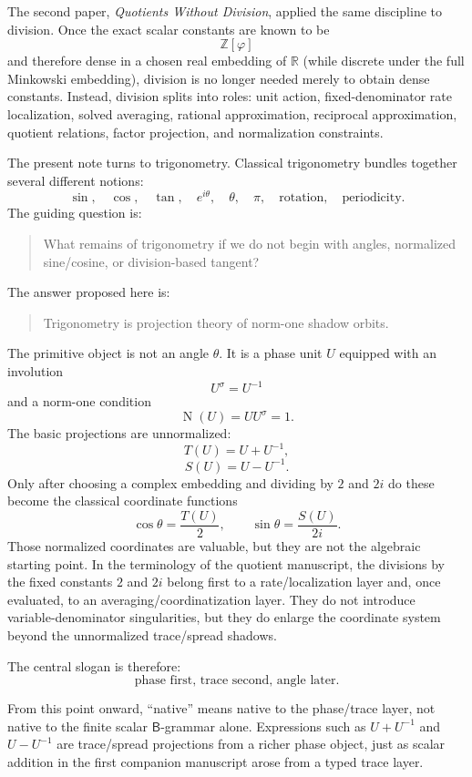\documentclass[11pt]{article}
\newcommand{\B}{\mathsf{B}}
\newcommand{\Nm}{\operatorname{N}}
\newcommand{\ph}{\varphi}
\newcommand{\sig}{\sigma}
\newcommand{\Z}{\mathbb{Z}}
\newcommand{\R}{\mathbb{R}}
\begin{document}
The second paper, \emph{Quotients Without Division}, applied the same discipline to division.  Once the exact scalar constants are known to be
\[
    \Z[\ph]
\]
and therefore dense in a chosen real embedding of $\R$ (while discrete under the full Minkowski embedding), division is no longer needed merely to obtain dense constants.  Instead, division splits into roles: unit action, fixed-denominator rate localization, solved averaging, rational approximation, reciprocal approximation, quotient relations, factor projection, and normalization constraints.

The present note turns to trigonometry.  Classical trigonometry bundles together several different notions:
\[
    \sin,\quad \cos,\quad \tan,\quad e^{i\theta},\quad \theta,
    \quad \pi,\quad \text{rotation},\quad \text{periodicity}.
\]
The guiding question is:
\begin{quote}
What remains of trigonometry if we do not begin with angles, normalized sine/cosine, or division-based tangent?
\end{quote}

The answer proposed here is:
\begin{quote}
Trigonometry is projection theory of norm-one shadow orbits.
\end{quote}

The primitive object is not an angle $\theta$.  It is a phase unit $U$ equipped with an involution
\[
    U^\sig=U^{-1}
\]
and a norm-one condition
\[
    \Nm(U)=UU^\sig=1.
\]
The basic projections are unnormalized:
\[
    T(U)=U+U^{-1},
\]
\[
    S(U)=U-U^{-1}.
\]
Only after choosing a complex embedding and dividing by $2$ and $2i$ do these become the classical coordinate functions
\[
    \cos\theta=\frac{T(U)}2,
    \qquad
    \sin\theta=\frac{S(U)}{2i}.
\]
Those normalized coordinates are valuable, but they are not the algebraic starting point.  In the terminology of the quotient manuscript, the divisions by the fixed constants $2$ and $2i$ belong first to a rate/localization layer and, once evaluated, to an averaging/coordinatization layer.  They do not introduce variable-denominator singularities, but they do enlarge the coordinate system beyond the unnormalized trace/spread shadows.

The central slogan is therefore:
\[
\boxed{\text{phase first, trace second, angle later}.}
\]

From this point onward, ``native'' means native to the phase/trace layer, not native to the finite scalar $\B$-grammar alone.  Expressions such as $U+U^{-1}$ and $U-U^{-1}$ are trace/spread projections from a richer phase object, just as scalar addition in the first companion manuscript arose from a typed trace layer.
\end{document}
